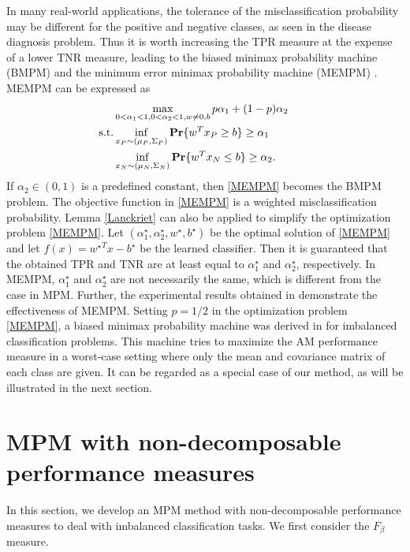 \documentclass[15pt]{article}
\begin{document}
In many real-world applications, the tolerance of the misclassification probability may be different
for the positive and negative classes, as seen in the disease diagnosis problem. Thus it is worth
increasing the TPR measure at the expense of a lower TNR measure, leading to
the biased minimax probability machine (BMPM) and the minimum error minimax probability
machine (MEMPM) \cite{Huang2004,Huang2004b}. MEMPM can be expressed as
\begin{align}\label{MEMPM}
\begin{split}
&\max_{0<\alpha_1<1,0<\alpha_2<1, w\neq 0,b} p\alpha_1+(1-p)\alpha_2\qquad \\
 \text{s.t.} &\inf_{x_P\sim(\mu_P,\Sigma_P)}{\rm\bf Pr}\{w^T x_P\ge b\}\ge\alpha_1 \\
&\inf_{x_N\sim(\mu_N,\Sigma_N)}{\rm\bf Pr}\{w^T x_N\le b\}\ge\alpha_2.
\end{split}
\end{align}
If $\alpha_2\in (0,1)$ is a predefined constant, then \eqref{MEMPM} becomes the BMPM problem.
The objective function in \eqref{MEMPM} is a weighted misclassification probability.
Lemma \ref{Lanckriet} can also be applied to simplify the optimization problem \eqref{MEMPM}.
Let $(\alpha_1^\star,\alpha_2^\star,w^\star,b^\star)$ be the optimal solution of \eqref{MEMPM}
and let $f(x)={w^\star}^Tx-b^\star$ be the learned classifier.
Then it is guaranteed that the obtained TPR and TNR are at least equal to $\alpha_1^\star$ and
$\alpha_2^\star$, respectively.
In MEMPM, $\alpha_1^\star$ and $\alpha_2^\star$ are not necessarily the same, which is different
from the case in MPM. Further, the experimental results obtained in \cite{Huang2004} demonstrate
the effectiveness of MEMPM.
Setting $p=1/2$ in the optimization problem \eqref{MEMPM}, a biased minimax probability machine
was derived in \cite{Huang2006} for imbalanced classification problems.
This machine tries to maximize the AM performance measure in a worst-case setting
where only the mean and covariance matrix of each class are given.
It can be regarded as a special case of our method, as will be illustrated in the next section.



\section{MPM with non-decomposable performance measures}\label{sec4}



In this section, we develop an MPM method with non-decomposable performance measures to deal with imbalanced 
classification tasks. We first consider the $F_\beta$ measure.
\end{document}
